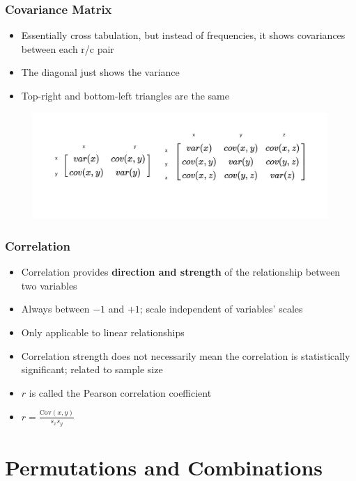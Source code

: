 \documentclass{article}
\begin{document}
\subsubsection{Covariance Matrix}

\begin{itemize}
    \item Essentially cross tabulation, but instead of frequencies, it shows covariances between each r/c pair
    \item The diagonal just shows the variance
    \item Top-right and bottom-left triangles are the same
\end{itemize}

\begin{figure}[H]
    \includegraphics[width=1\linewidth]{Covariance-Matrix.jpg}
\end{figure}

\subsubsection{Correlation}

\begin{itemize}
    \item Correlation provides \textbf{direction and strength} of the relationship between two variables
    \item Always between $-1$ and $+1$; scale independent of variables' scales
    \item Only applicable to linear relationships
    \item Correlation strength does not necessarily mean the correlation is statistically significant; related to sample size
    \item $r$ is called the Pearson correlation coefficient
    \item $r=\frac{\text{Cov}(x,y)}{s_xs_y}$
\end{itemize}

\section{Permutations and Combinations}
\end{document}
